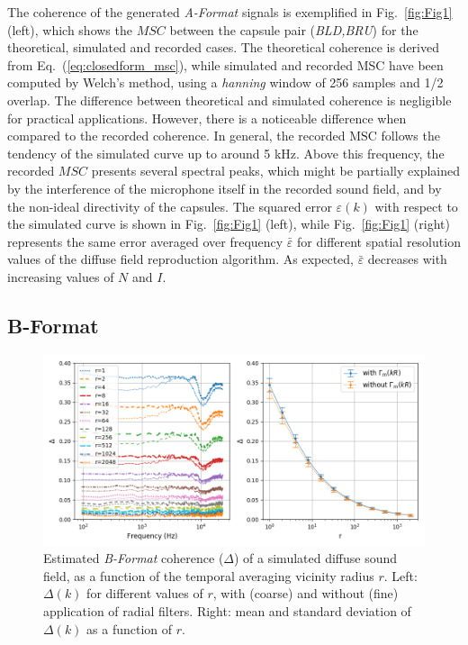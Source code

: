 The coherence of the generated \textit{A-Format} signals is exemplified in Fig.~\ref{fig:Fig1} (left), which shows the $MSC$ between the capsule pair (\textit{BLD,BRU}) for the theoretical, simulated and recorded cases.
The theoretical coherence is derived from Eq.~(\ref{eq:closedform_msc}), while simulated and recorded MSC have been computed by Welch's method, using a \textit{hanning} window of 256 samples and 1/2 overlap.
The difference between theoretical and simulated coherence is negligible for practical applications.
However, there is a noticeable difference when compared to the recorded coherence. 
In general, the recorded $\text{MSC}$ follows the tendency of the simulated curve up to around 5 kHz.
Above this frequency, the recorded $MSC$ presents several spectral peaks, which might be partially explained by the interference of the microphone itself in the recorded sound field, and by the non-ideal directivity of the capsules.
The squared error $\varepsilon(k)$ with respect to the simulated curve is shown in Fig.~\ref{fig:Fig1} (left), while Fig.~\ref{fig:Fig1} (right) represents the same error averaged over frequency $\bar{\varepsilon}$ for different spatial resolution values of the diffuse field reproduction algorithm.
As expected, $\bar{\varepsilon}$ decreases with increasing values of $N$ and $I$.




\subsection{B-Format} 
\begin{figure}
	\includegraphics[width=\textwidth]{Figures/CoherenceEstimation/Figure2}
	\caption{\label{fig:Fig2} Estimated \textit{B-Format} coherence ($\Delta$) of a simulated diffuse sound field, as a function of the temporal averaging vicinity radius $r$. Left: $\Delta(k)$ for different values of $r$, with (coarse) and without (fine) application of radial filters. Right: mean and standard deviation of $\Delta(k)$ as a function of $r$.}
\end{figure}

